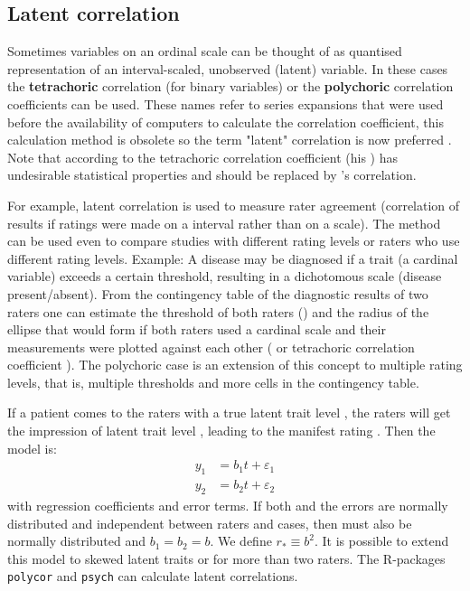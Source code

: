 \begin{refsection}
\subsection{Latent correlation}

Sometimes variables on an ordinal scale can be thought of as quantised representation of an interval-scaled, unobserved (latent) variable. In these cases the \textbf{tetrachoric} correlation (for binary variables) or the \textbf{polychoric} correlation coefficients can be used. These names refer to series expansions that were used before the availability of computers to calculate the correlation coefficient, this calculation method is obsolete so the term "latent" correlation is now preferred \parencite{Ueb-15,Ols-79}. Note that according to \parencite{Hub-82} the tetrachoric correlation coefficient (his ) has undesirable statistical properties and should be replaced by 's correlation.

For example, latent correlation is used to measure rater agreement (correlation of results if ratings were made on a interval rather than on a  \parencite{Lik-32} scale). The method can be used even to compare studies with different rating levels or raters who use different rating levels. Example: A disease may be diagnosed if a trait (a cardinal variable) exceeds a certain threshold, resulting in a dichotomous scale (disease present/absent). From the contingency table of the diagnostic results of two raters one can estimate the threshold of both raters () and the radius of the ellipse that would form if both raters used a cardinal scale and their measurements were plotted against each other (\skalar{\rho} or tetrachoric correlation coefficient ). The polychoric case is an extension of this concept to multiple rating levels, that is, multiple thresholds and more cells in the contingency table.

If a patient comes to the raters with a true latent trait level , the raters will get the
impression of latent trait level , leading to the manifest rating . Then the
model is:
\begin{align}
  y_1 &= b_1 t + \varepsilon_1 \\
  y_2 &= b_2 t + \varepsilon_2
\end{align}
with  regression coefficients and  error terms. If both  and the errors are normally distributed and independent between raters and cases, then  must also be normally distributed and \(b_1 = b_2 = b \). We define \(r_* \equiv b^2 \). It is possible to extend this model to skewed latent traits or for more than two raters. The R-packages \texttt{polycor} and \texttt{psych} can calculate latent correlations.



\printbibliography[heading=subbibliography]
\end{refsection}
